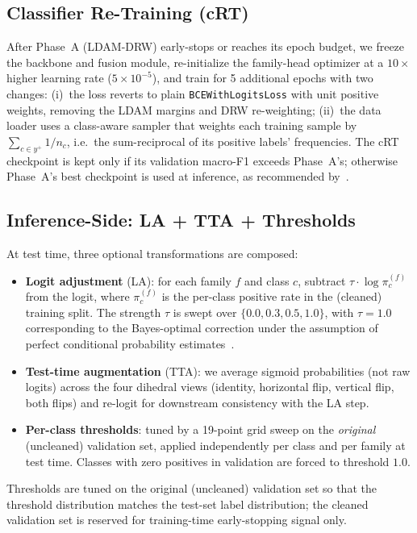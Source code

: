 \documentclass[journal]{IEEEtran}
\begin{document}
\subsection{Classifier Re-Training (cRT)}\label{ssec:crt}

After Phase~A (LDAM-DRW) early-stops or reaches its epoch budget, we freeze the backbone and fusion module, re-initialize the family-head optimizer at a $10\times$ higher learning rate ($5\!\times\!10^{-5}$), and train for 5 additional epochs with two changes: (i)~the loss reverts to plain \texttt{BCEWithLogitsLoss} with unit positive weights, removing the LDAM margins and DRW re-weighting; (ii)~the data loader uses a class-aware sampler that weights each training sample by $\sum_{c \in y^+} 1/n_c$, i.e.\ the sum-reciprocal of its positive labels' frequencies. The cRT checkpoint is kept only if its validation macro-F1 exceeds Phase~A's; otherwise Phase~A's best checkpoint is used at inference, as recommended by~\cite{kang2020decoupling}.

\subsection{Inference-Side: LA + TTA + Thresholds}\label{ssec:inference}

At test time, three optional transformations are composed:
\begin{itemize}
  \item \textbf{Logit adjustment} (LA): for each family $f$ and class $c$, subtract $\tau \cdot \log \pi_c^{(f)}$ from the logit, where $\pi_c^{(f)}$ is the per-class positive rate in the (cleaned) training split. The strength $\tau$ is swept over $\{0.0, 0.3, 0.5, 1.0\}$, with $\tau=1.0$ corresponding to the Bayes-optimal correction under the assumption of perfect conditional probability estimates~\cite{menon2021logitadjust}.
  \item \textbf{Test-time augmentation} (TTA): we average sigmoid probabilities (not raw logits) across the four dihedral views (identity, horizontal flip, vertical flip, both flips) and re-logit for downstream consistency with the LA step.
  \item \textbf{Per-class thresholds}: tuned by a 19-point grid sweep on the \emph{original} (uncleaned) validation set, applied independently per class and per family at test time. Classes with zero positives in validation are forced to threshold $1.0$.
\end{itemize}
Thresholds are tuned on the original (uncleaned) validation set so that the threshold distribution matches the test-set label distribution; the cleaned validation set is reserved for training-time early-stopping signal only.
\end{document}
